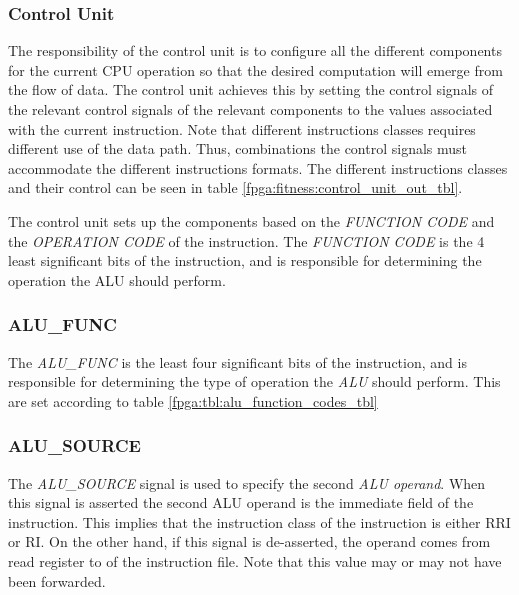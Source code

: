 \subsubsection{Control Unit} 
The responsibility of the control unit is to configure all the different components for the current CPU operation so that the desired computation will emerge from the flow of data.
The control unit achieves this by setting the control signals of the relevant control signals of the relevant components to the values associated with the current instruction.
Note that different instructions classes requires different use of the data path.
Thus, combinations the control signals must accommodate the different instructions formats. The different instructions classes and their control can be seen in table \ref{fpga:fitness:control_unit_out_tbl}. 

The control unit sets up the components based on the \emph{FUNCTION CODE} and the \emph{OPERATION CODE} of the instruction. The \emph{FUNCTION CODE} is the 4 least significant bits of the instruction, and is responsible for determining the operation the ALU should perform. 

 

 


















\subsubsection{ALU\_FUNC}
The \emph{ALU\_FUNC} is the least four significant bits of the instruction, and is responsible for determining the type of operation the \emph{ALU} should perform. This are set according to table \ref{fpga:tbl:alu_function_codes_tbl} 




\subsubsection{ALU\_SOURCE}
The \emph{ALU\_SOURCE} signal is used to specify the second \emph{ALU operand}. When this signal is asserted the second ALU operand is the immediate field of the instruction. This implies that the instruction class of the instruction is either RRI or RI. On the other hand, if this signal is de-asserted, the operand comes from read register to of the instruction file. Note that this value may or may not have been forwarded. 

